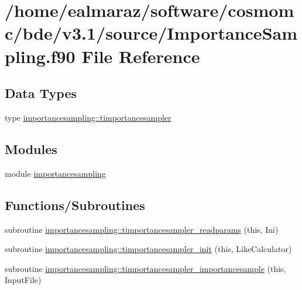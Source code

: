 \hypertarget{ImportanceSampling_8f90}{}\section{/home/ealmaraz/software/cosmomc/bde/v3.1/source/\+Importance\+Sampling.f90 File Reference}
\label{ImportanceSampling_8f90}
\subsection*{Data Types}
\begin{DoxyCompactItemize}
\item 
type \mbox{\hyperlink{structimportancesampling_1_1timportancesampler}{importancesampling\+::timportancesampler}}
\end{DoxyCompactItemize}
\subsection*{Modules}
\begin{DoxyCompactItemize}
\item 
module \mbox{\hyperlink{namespaceimportancesampling}{importancesampling}}
\end{DoxyCompactItemize}
\subsection*{Functions/\+Subroutines}
\begin{DoxyCompactItemize}
\item 
subroutine \mbox{\hyperlink{namespaceimportancesampling_a39599f2e0377c272c415338ef81396df}{importancesampling\+::timportancesampler\+\_\+readparams}} (this, Ini)
\item 
subroutine \mbox{\hyperlink{namespaceimportancesampling_a3004e02389d8cf9b604c564fbfef6d9f}{importancesampling\+::timportancesampler\+\_\+init}} (this, Like\+Calculator)
\item 
subroutine \mbox{\hyperlink{namespaceimportancesampling_a3f315e6a06f67ec1e9e1c310e410a10a}{importancesampling\+::timportancesampler\+\_\+importancesample}} (this, Input\+File)
\end{DoxyCompactItemize}
